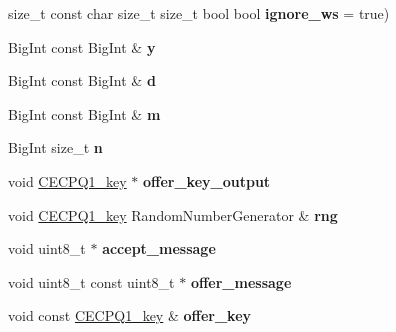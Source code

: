 \begin{DoxyCompactItemize}
\item 
\mbox{\label{namespace_botan_a98cc94b58e3ee6419d77259d708116df}} 
size\+\_\+t const char size\+\_\+t size\+\_\+t bool bool {\bfseries ignore\+\_\+ws} = true)
\item 
\mbox{\label{namespace_botan_af505d77813ef6f8adafb7d5f4c473346}} 
Big\+Int const Big\+Int \& {\bfseries y}
\item 
\mbox{\label{namespace_botan_a273d9afd937ccb083af5cc0b8b375bdf}} 
Big\+Int const Big\+Int \& {\bfseries d}
\item 
\mbox{\label{namespace_botan_af405c5775a4542d37f7f3f532735d18f}} 
Big\+Int const Big\+Int \& {\bfseries m}
\item 
\mbox{\label{namespace_botan_a20f5e311788b662f3901195ff7a4a09e}} 
Big\+Int size\+\_\+t {\bfseries n}
\item 
\mbox{\label{namespace_botan_a4ec869250a45251b833e32a86445d5af}} 
void \hyperlink{class_botan_1_1_c_e_c_p_q1__key}{C\+E\+C\+P\+Q1\+\_\+key} $\ast$ {\bfseries offer\+\_\+key\+\_\+output}
\item 
\mbox{\label{namespace_botan_ab4f125dc1e7d8d6f9cabe9545402550b}} 
void \hyperlink{class_botan_1_1_c_e_c_p_q1__key}{C\+E\+C\+P\+Q1\+\_\+key} Random\+Number\+Generator \& {\bfseries rng}
\item 
\mbox{\label{namespace_botan_a151b2f3408addca5a024b0cd417bd0f5}} 
void uint8\+\_\+t $\ast$ {\bfseries accept\+\_\+message}
\item 
\mbox{\label{namespace_botan_a3483a2527a136be8127ee4350b593bf4}} 
void uint8\+\_\+t const uint8\+\_\+t $\ast$ {\bfseries offer\+\_\+message}
\item 
\mbox{\label{namespace_botan_a7c700ef92957751a720588ae8897ecc1}} 
void const \hyperlink{class_botan_1_1_c_e_c_p_q1__key}{C\+E\+C\+P\+Q1\+\_\+key} \& {\bfseries offer\+\_\+key}
\item 
\mbox{\label{namespace_botan_a5a34371c8a6b1fd28279ee9d0170ada2}} 

\end{DoxyCompactItemize}
